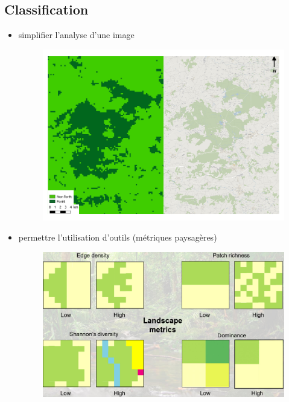 \documentclass[11pt]{beamer}
\begin{document}
\subsection{Classification}
\begin{frame}{}
\begin{itemize}
\item simplifier l'analyse d'une image
\begin{figure}[!h]
\centering
\includegraphics[scale=0.29]{img/classif_exemple.pdf}
\end{figure}
\end{itemize}
\end{frame}

\begin{frame}{}
\begin{itemize}
\item permettre l'utilisation d'outils (métriques paysagères)
\begin{figure}[!h]
\centering
\includegraphics[scale=0.22]{img/metrique_paysage.png}
\end{figure}
\end{itemize}
\end{frame}
\end{document}
